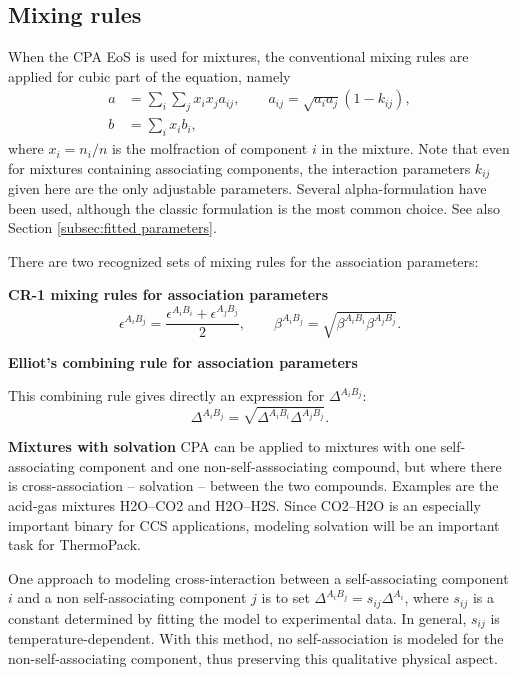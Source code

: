 \documentclass[english]{../thermomemo/thermomemo}
\begin{document}
\subsection{Mixing rules}
When the CPA EoS is used for mixtures, the conventional mixing rules are applied for cubic part of the equation, namely
\begin{align}
  a &= \sum_i \sum_j x_i x_j a_{ij}, \qquad a_{ij} = \sqrt{a_i a_j} (1-k_{ij}), \\
  b &= \sum_i x_i b_i,
\end{align}
where $x_i = n_i/n$ is the molfraction of component $i$ in the mixture. Note that even for mixtures containing associating components, the interaction parameters $k_{ij}$ given here are the only adjustable parameters. Several alpha-formulation have been used, although the classic formulation is the most common choice. See also Section \ref{subsec:fitted parameters}.

There are two recognized sets of mixing rules for the association parameters: %

\textbf{CR-1 mixing rules for association parameters}
\begin{equation}
  \epsilon^{A_i B_j} = \frac{\epsilon^{A_i B_i} + \epsilon^{A_j B_j}}{2}, \qquad \beta^{A_i B_j} = \sqrt{\beta^{A_i B_i} \beta^{A_j B_j}}.
\end{equation}

\textbf{Elliot's combining rule for association parameters}

This combining rule gives directly an expression for $\Delta^{A_i B_j}$:
\begin{equation}
  \Delta^{A_i B_j} = \sqrt{\Delta^{A_i B_i} \Delta^{A_j B_j}}.
\end{equation}

\textbf{Mixtures with solvation}
CPA can be applied to mixtures with one self-associating component and one non-self-asssociating compound, but where there is cross-association -- solvation -- between the two compounds. Examples are the acid-gas mixtures H2O--CO2 and H2O--H2S. Since CO2--H2O is an especially important binary for CCS applications, modeling solvation will be an important task for ThermoPack.

One approach to modeling cross-interaction between a self-associating component $i$ and a non self-associating component $j$ is to set $\Delta^{A_i B_j} = s_{ij} \Delta^{A_i}$, where $s_{ij}$ is a constant determined by fitting the model to experimental data. In general, $s_{ij}$ is temperature-dependent. With this method, no self-association is modeled for the non-self-associating component, thus preserving this qualitative physical aspect. %
\end{document}

